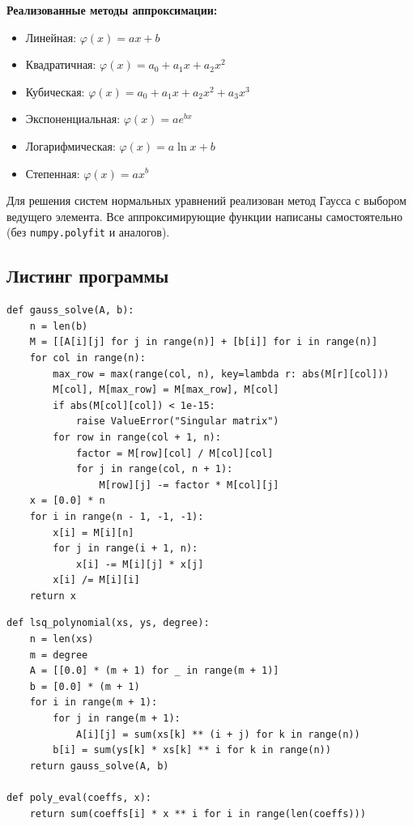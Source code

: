 \documentclass[a4paper,12pt]{article}
\begin{document}
\textbf{Реализованные методы аппроксимации:}
\begin{itemize}
    \item Линейная: $\varphi(x) = ax + b$
    \item Квадратичная: $\varphi(x) = a_0 + a_1x + a_2x^2$
    \item Кубическая: $\varphi(x) = a_0 + a_1x + a_2x^2 + a_3x^3$
    \item Экспоненциальная: $\varphi(x) = ae^{bx}$
    \item Логарифмическая: $\varphi(x) = a\ln x + b$
    \item Степенная: $\varphi(x) = ax^b$
\end{itemize}

Для решения систем нормальных уравнений реализован метод Гаусса с выбором ведущего элемента. Все аппроксимирующие функции написаны самостоятельно (без \texttt{numpy.polyfit} и аналогов).

\subsection{Листинг программы}

\begin{lstlisting}[style=intellij, caption={Решение СЛАУ методом Гаусса}]
def gauss_solve(A, b):
    n = len(b)
    M = [[A[i][j] for j in range(n)] + [b[i]] for i in range(n)]
    for col in range(n):
        max_row = max(range(col, n), key=lambda r: abs(M[r][col]))
        M[col], M[max_row] = M[max_row], M[col]
        if abs(M[col][col]) < 1e-15:
            raise ValueError("Singular matrix")
        for row in range(col + 1, n):
            factor = M[row][col] / M[col][col]
            for j in range(col, n + 1):
                M[row][j] -= factor * M[col][j]
    x = [0.0] * n
    for i in range(n - 1, -1, -1):
        x[i] = M[i][n]
        for j in range(i + 1, n):
            x[i] -= M[i][j] * x[j]
        x[i] /= M[i][i]
    return x
\end{lstlisting}

\begin{lstlisting}[style=intellij, caption={Полиномиальная аппроксимация МНК (общий случай)}]
def lsq_polynomial(xs, ys, degree):
    n = len(xs)
    m = degree
    A = [[0.0] * (m + 1) for _ in range(m + 1)]
    b = [0.0] * (m + 1)
    for i in range(m + 1):
        for j in range(m + 1):
            A[i][j] = sum(xs[k] ** (i + j) for k in range(n))
        b[i] = sum(ys[k] * xs[k] ** i for k in range(n))
    return gauss_solve(A, b)

def poly_eval(coeffs, x):
    return sum(coeffs[i] * x ** i for i in range(len(coeffs)))
\end{lstlisting}
\end{document}

